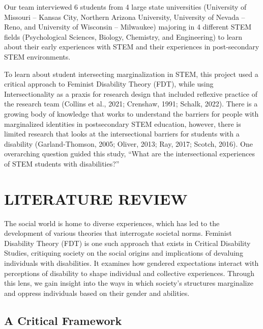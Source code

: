 \documentclass{sig-alternate} %
\begin{document}
\begin{large}
Our team interviewed 6 students from 4 large state universities (University of Missouri – Kansas City, Northern Arizona University, University of Nevada – Reno, and University of Wisconsin – Milwaukee) majoring in 4 different STEM fields (Psychological Sciences, Biology, Chemistry, and Engineering) to learn about their early experiences with STEM and their experiences in post-secondary STEM environments. 

To learn about student intersecting marginalization in STEM, this project used a critical approach to Feminist Disability Theory (FDT), while using Intersectionality as a praxis for research design that included reflexive practice of the research team (Collins et al., 2021; Crenshaw, 1991; Schalk, 2022). There is a growing body of knowledge that works to understand the barriers for people with marginalized identities in postsecondary STEM education, however, there is limited research that looks at the intersectional barriers for students with a disability (Garland-Thomson, 2005; Oliver, 2013; Ray, 2017; Scotch, 2016). One overarching question guided this study, “What are the intersectional experiences of STEM students with disabilities?”

\vspace{1em}

\section*{LITERATURE REVIEW}

The social world is home to diverse experiences, which has led to the development of various theories that interrogate societal norms. Feminist Disability Theory (FDT) is one such approach that exists in Critical Disability Studies, critiquing society on the social origins and implications of devaluing individuals with disabilities. It examines how gendered expectations interact with perceptions of disability to shape individual and collective experiences. Through this lens, we gain insight into the ways in which society's structures marginalize and oppress individuals based on their gender and abilities.

\subsection*{A Critical Framework}


\end{large}
\end{document}

